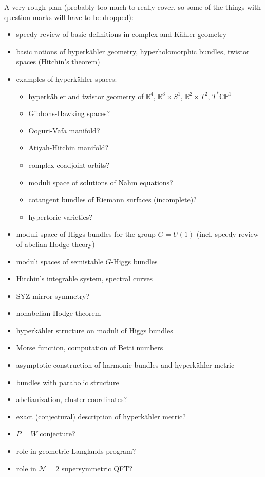 \documentclass[12pt,letterpaper,reqno]{amsart}
\numberwithin{equation}{section}
\newcommand{\R}{\ensuremath{\mathbb R}}
\newcommand{\C}{\ensuremath{\mathbb C}}
\newcommand{\PP}{\ensuremath{\mathbb P}}
\newcommand{\N}{{\mathcal N}}
\newcommand{\kahler}{K\"ahler\xspace}
\newcommand{\hk}{hyperk\"ahler\xspace}
\begin{document}
A very rough plan (probably too much to really cover,
so some of the things with question marks will have 
to be dropped):
\begin{itemize}
  \item speedy review of basic definitions in complex and \kahler geometry
  \item basic notions of \hk geometry, hyperholomorphic bundles, twistor spaces (Hitchin's theorem)
  \item examples of \hk spaces:
  \begin{itemize}
  \item \hk and twistor geometry of $\R^4$, $\R^3 \times S^1$, $\R^2 \times T^2$, $T^* \C\PP^1$
  \item Gibbons-Hawking spaces?
  \item Ooguri-Vafa manifold?
  \item Atiyah-Hitchin manifold?
  \item complex coadjoint orbits?
  \item moduli space of solutions of Nahm equations?
  \item cotangent bundles of Riemann surfaces (incomplete)?
  \item hypertoric varieties?
  \end{itemize}
  \item moduli space of Higgs bundles for the group $G = U(1)$ (incl. speedy review of abelian Hodge theory)
  \item moduli spaces of semistable $G$-Higgs bundles
  \item Hitchin's integrable system, spectral curves
  \item SYZ mirror symmetry?
  \item nonabelian Hodge theorem
  \item \hk structure on moduli of Higgs bundles
  \item Morse function, computation of Betti numbers
  \item asymptotic construction of harmonic bundles and \hk metric
  \item bundles with parabolic structure
  \item abelianization, cluster coordinates?
  \item exact (conjectural) description of \hk metric?
  \item $P=W$ conjecture?
  \item role in geometric Langlands program?
  \item role in $\N=2$ supersymmetric QFT?
\end{itemize}
\end{document}

